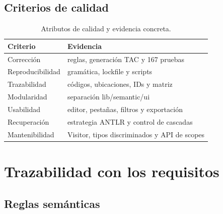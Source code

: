 \documentclass[11pt,letterpaper,oneside]{report}
\begin{document}
\section{Criterios de calidad}

\begin{table}[H]
\centering
\begin{tabularx}{\textwidth}{lY}
\toprule
Criterio & Evidencia \\
\midrule
Corrección & reglas, generación TAC y 167 pruebas \\
Reproducibilidad & gramática, lockfile y scripts \\
Trazabilidad & códigos, ubicaciones, IDs y matriz \\
Modularidad & separación lib/semantic/ui \\
Usabilidad & editor, pestañas, filtros y exportación \\
Recuperación & estrategia ANTLR y control de cascadas \\
Mantenibilidad & Visitor, tipos discriminados y API de scopes \\
\bottomrule
\end{tabularx}
\caption{Atributos de calidad y evidencia concreta.}
\end{table}

\chapter{Trazabilidad con los requisitos}

\section{Reglas semánticas}
\end{document}

